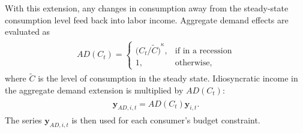 \documentclass[\latexroot/\projectname]{subfiles}
\begin{document}
With this extension, any changes in consumption away from the steady-state consumption level feed back into labor income.
Aggregate demand effects are evaluated as
\begin{equation}
  \begin{gathered}
    \begin{aligned}
      AD(C_t) =   \begin{cases}{\Big(C_t/\tilde{C}\Big)}^\kappa, & \text{if in a recession} \\
             1,                                & \text{otherwise} ,
                  \end{cases}
    \end{aligned}
  \end{gathered}
\end{equation}
where $\tilde{C}$ is the level of consumption in the steady state.
Idiosyncratic income in the aggregate demand extension is multiplied by $AD(C_t)$:
\begin{equation}
  \begin{gathered}
    \begin{aligned}
      \mathbf{y}_{AD,i,t} = AD(C_t)\mathbf{y}_{i,t}.
    \end{aligned}
  \end{gathered}
\end{equation}
The series $\mathbf{y}_{AD,i,t}$ is then used for each consumer's budget constraint.

\smartbib

\pdfonly{
  \captionsetup[figure]{list=no}
  \captionsetup[table]{list=no}
}
\end{document}
